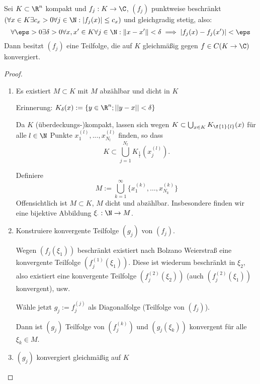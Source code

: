 \documentclass{mycourse}
\begin{document}
\begin{st} \label{1.29}
	Sei $K \subset \R^n$ kompakt und $f_j : K \to \C$, $(f_j)$ punktweise beschränkt $(\forall x \in K \exists c_x >0 \forall j\in \N : |f_j(x)|\le c_x)$ und gleichgradig stetig, also:
	\[
		\forall \eps > 0 \exists \delta > 0 \forall x,x' \in K \forall j \in \N : \|x-x'\| < \delta \implies |f_j(x)-f_j(x')| < \eps
	\]
	Dann besitzt $(f_j)$ eine Teilfolge, die auf $K$ gleichmäßig gegen $f\in C(K \to \C)$ konvergiert.
	\begin{proof}
		\begin{enumerate}[1)]
			\item
				Es existiert $M \subset K$ mit $M$ abzählbar und dicht in $K$
				
				  Erinnerung: $ K_\delta(x):= \{y\in \R^n; ||y-x||<\delta \} $
				
				  Da $ K $ (überdeckungs-)kompakt, lassen sich wegen $ K\subset \bigcup_{x\in K} K_{\f{1}{l}}(x) $ für alle $ l\in \N $ Punkte $ x_1^{(l)},..., x^{(l)}_{N_l} $ finden, so dass 
				  \[
				  K\subset \bigcup_{j=1}^{N_l} K_{\frac{1}{l}}(x_j^{(l)}).
				  \]
					
					Definiere
					\[
						M := \bigcup_{k=1}^\infty \Big\{x_1^{(k)}, \dotsc, x_{N_k}^{(k)}\Big\} 
					\]
					Offensichtlich ist $M \subset K$, $M$ dicht und abzählbar. Insbesondere finden wir eine bijektive Abbildung $ \xi_\cdot: \N \to M $.
				
			\item
				Konstruiere konvergente Teilfolge $(g_j)$ von $(f_j)$.
				
					Wegen $(f_j(\xi_1))$ beschränkt existiert nach Bolzano Weierstraß eine konvergente Teilfolge $(f_j^{(1)}(\xi_1))$.
					Diese ist wiederum beschränkt in $\xi_2$, also existiert eine konvergente Teilfolge $(f_j^{(2)}(\xi_2))$ (auch $(f_j^{(2)}(\xi_1))$ konvergent), usw.

					Wähle jetzt $g_j := f_j^{(j)}$ als Diagonalfolge (Teilfolge von $(f_j)$).

					Dann ist $(g_j)$ Teilfolge von $(f_j^{(k)})$ und $(g_j(\xi_k))$ konvergent für alle $\xi_k \in M$.
			\item
				$(g_j)$ konvergiert gleichmäßig auf $K$
				

\end{enumerate}
\end{proof}
\end{st}
\end{document}

